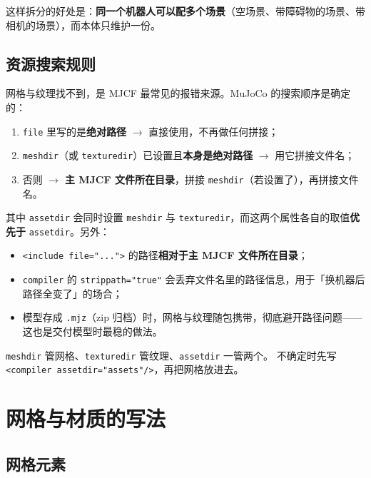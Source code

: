 这样拆分的好处是：\textbf{同一个机器人可以配多个场景}（空场景、带障碍物的场景、带相机的场景），而本体只维护一份。

\subsection{资源搜索规则}

网格与纹理找不到，是 MJCF 最常见的报错来源。MuJoCo 的搜索顺序是确定的：

\begin{enumerate}
	\item \texttt{file} 里写的是\textbf{绝对路径} $\rightarrow$ 直接使用，不再做任何拼接；
	\item \texttt{meshdir}（或 \texttt{texturedir}）已设置且\textbf{本身是绝对路径} $\rightarrow$ 用它拼接文件名；
	\item 否则 $\rightarrow$ \textbf{主 MJCF 文件所在目录}，拼接 \texttt{meshdir}（若设置了），再拼接文件名。
\end{enumerate}

其中 \texttt{assetdir} 会同时设置 \texttt{meshdir} 与 \texttt{texturedir}，而这两个属性各自的取值\textbf{优先于} \texttt{assetdir}。另外：

\begin{itemize}
	\item \texttt{<include file="...">} 的路径\textbf{相对于主 MJCF 文件所在目录}；
	\item \texttt{compiler} 的 \texttt{strippath="true"} 会丢弃文件名里的路径信息，用于「换机器后路径全变了」的场合；
	\item 模型存成 \texttt{.mjz}（zip 归档）时，网格与纹理随包携带，彻底避开路径问题——这也是交付模型时最稳的做法。
\end{itemize}

\begin{tipbox}
	\texttt{meshdir} 管网格、\texttt{texturedir} 管纹理、\texttt{assetdir} 一管两个。
	不确定时先写 \texttt{<compiler assetdir="assets"/>}，再把网格放进去。
\end{tipbox}

\section{网格与材质的写法}

\subsection{网格元素}

